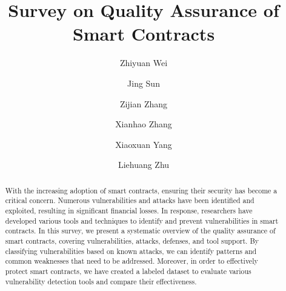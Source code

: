 \documentclass[manuscript,screen]{acmart}
\begin{document}
\title{Survey on Quality Assurance of Smart Contracts}


\author{Zhiyuan Wei}

\author{Jing Sun}

\author{Zijian Zhang}
\authornotemark[1]
\author{Xianhao Zhang}
\author{Xiaoxuan Yang}
\author{Liehuang Zhu}

\renewcommand{\shortauthors}{Wei et al.}

\begin{abstract}
  With the increasing adoption of smart contracts, ensuring their security has become a critical concern. Numerous vulnerabilities and attacks have been identified and exploited, resulting in significant financial losses. In response, researchers have developed various tools and techniques to identify and prevent vulnerabilities in smart contracts. In this survey, we present a systematic overview of the quality assurance of smart contracts, covering vulnerabilities, attacks, defenses, and tool support.
  By classifying vulnerabilities based on known attacks, we can identify patterns and common weaknesses that need to be addressed. Moreover, in order to effectively protect smart contracts, we have created a labeled dataset to evaluate various vulnerability detection tools and compare their effectiveness.
\end{abstract}
\end{document}
